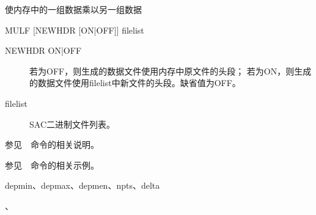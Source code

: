 \label{cmd:mulf}

使内存中的一组数据乘以另一组数据

\begin{SACSTX}
MULF [NEWHDR [ON|OFF]] filelist
\end{SACSTX}

\begin{description}
\item [NEWHDR ON|OFF] 若为OFF，则生成的数据文件使用内存中原文件的头段；
    若为ON，则生成的数据文件使用filelist中新文件的头段。缺省值为OFF。
\item [filelist] SAC二进制文件列表。
\end{description}

参见~~命令的相关说明。

参见~~命令的相关示例。

depmin、depmax、depmen、npts、delta

、
